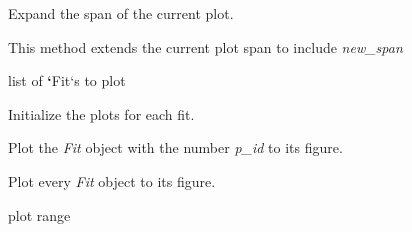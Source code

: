 \documentclass[a4paper,10pt,english]{sphinxmanual}
\begin{document}
\begin{fulllineitems}

\begin{fulllineitems}
\label{index:kafe.plot.Plot.extend_span}
Expand the span of the current plot.

This method extends the current plot span to include \emph{new\_span}

\end{fulllineitems}


\begin{fulllineitems}
\label{index:kafe.plot.Plot.fits}
list of {\color{red}\bfseries{}{}`}Fit{}`s to plot

\end{fulllineitems}


\begin{fulllineitems}
\label{index:kafe.plot.Plot.init_plots}
Initialize the plots for each fit.

\end{fulllineitems}


\begin{fulllineitems}
\label{index:kafe.plot.Plot.plot}
Plot the \emph{Fit} object with the number \emph{p\_id} to its figure.

\end{fulllineitems}


\begin{fulllineitems}
\label{index:kafe.plot.Plot.plot_all}
Plot every \emph{Fit} object to its figure.

\end{fulllineitems}


\begin{fulllineitems}
\label{index:kafe.plot.Plot.plot_range}
plot range


\end{fulllineitems}
\end{fulllineitems}
\end{document}
